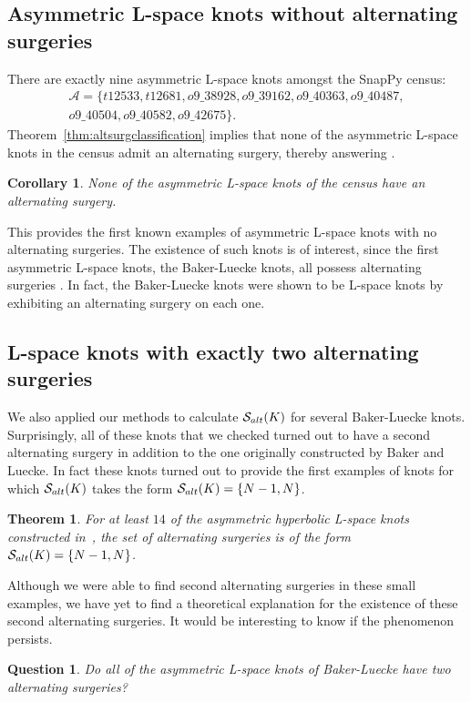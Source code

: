 \documentclass{amsart} %
\newcommand{\calA}{\mathcal{A}}
\newcommand{\Salt}{\mathcal{S}_{\rm alt}}
\theoremstyle{thm}
\newtheorem{thm}[Theorem]{Theorem}
\newtheorem{cor}[Theorem]{Corollary}
\newtheorem{ques}[Theorem]{Question}
\theoremstyle{definition}
\numberwithin{equation}{section}
\begin{document}
\subsection{Asymmetric L-space knots without alternating surgeries}
There are exactly nine asymmetric L-space knots amongst the SnapPy census:
\begin{align*}
\calA=\{t12533,t12681,o9\_38928,o9\_39162,o9\_40363,o9\_40487,\\o9\_40504,o9\_40582,o9\_42675\}.
\end{align*}
Theorem~\ref{thm:altsurgclassification} implies that none of the asymmetric L-space knots in the census admit an alternating surgery, thereby answering \cite[Question 10]{ABG+19}.
\begin{cor}\label{cor:asymetric}
None of the asymmetric L-space knots of the census have an alternating surgery.
\end{cor}
This provides the first known examples of asymmetric L-space knots with no alternating surgeries. The existence of such knots is of interest, since the first asymmetric L-space knots, the Baker-Luecke knots, all possess alternating surgeries \cite{BL17}. In fact, the Baker-Luecke knots were shown to be L-space knots by exhibiting an alternating surgery on each one. 

\subsection{L-space knots with exactly two alternating surgeries}
We also applied our methods to calculate $\Salt(K)$ for several Baker-Luecke knots. Surprisingly, all of these knots that we checked turned out to have a second alternating surgery in addition to the one originally constructed by Baker and Luecke. In fact these knots turned out to provide the first examples of knots for which $\Salt(K)$ takes the form $\Salt(K)=\{N-1, N\}$.

\begin{thm} 
For at least $14$ of the asymmetric hyperbolic L-space knots constructed in~\cite{BL17}, the set of alternating surgeries is of the form $\Salt(K)=\{N-1, N\}$. 
\end{thm}
Although we were able to find second alternating surgeries in these small examples, we have yet to find a theoretical explanation for the existence of these second alternating surgeries. It would be interesting to know if the phenomenon persists. 

\begin{ques}\label{ques:otherslopeBLknots}
Do all of the asymmetric L-space knots of Baker-Luecke have two alternating surgeries?
\end{ques}
\end{document}
